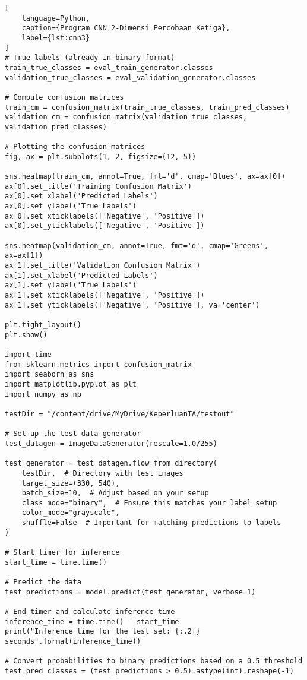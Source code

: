 \begin{lstlisting}[
    language=Python,
    caption={Program CNN 2-Dimensi Percobaan Ketiga},
    label={lst:cnn3}
]
# True labels (already in binary format)
train_true_classes = eval_train_generator.classes
validation_true_classes = eval_validation_generator.classes

# Compute confusion matrices
train_cm = confusion_matrix(train_true_classes, train_pred_classes)
validation_cm = confusion_matrix(validation_true_classes, validation_pred_classes)

# Plotting the confusion matrices
fig, ax = plt.subplots(1, 2, figsize=(12, 5))

sns.heatmap(train_cm, annot=True, fmt='d', cmap='Blues', ax=ax[0])
ax[0].set_title('Training Confusion Matrix')
ax[0].set_xlabel('Predicted Labels')
ax[0].set_ylabel('True Labels')
ax[0].set_xticklabels(['Negative', 'Positive'])
ax[0].set_yticklabels(['Negative', 'Positive'])

sns.heatmap(validation_cm, annot=True, fmt='d', cmap='Greens', ax=ax[1])
ax[1].set_title('Validation Confusion Matrix')
ax[1].set_xlabel('Predicted Labels')
ax[1].set_ylabel('True Labels')
ax[1].set_xticklabels(['Negative', 'Positive'])
ax[1].set_yticklabels(['Negative', 'Positive'], va='center')

plt.tight_layout()
plt.show()

import time
from sklearn.metrics import confusion_matrix
import seaborn as sns
import matplotlib.pyplot as plt
import numpy as np

testDir = "/content/drive/MyDrive/KeperluanTA/testout"

# Set up the test data generator
test_datagen = ImageDataGenerator(rescale=1.0/255)

test_generator = test_datagen.flow_from_directory(
    testDir,  # Directory with test images
    target_size=(330, 540),
    batch_size=10,  # Adjust based on your setup
    class_mode="binary",  # Ensure this matches your label setup
    color_mode="grayscale",
    shuffle=False  # Important for matching predictions to labels
)

# Start timer for inference
start_time = time.time()

# Predict the data
test_predictions = model.predict(test_generator, verbose=1)

# End timer and calculate inference time
inference_time = time.time() - start_time
print("Inference time for the test set: {:.2f} seconds".format(inference_time))

# Convert probabilities to binary predictions based on a 0.5 threshold
test_pred_classes = (test_predictions > 0.5).astype(int).reshape(-1)


\end{lstlisting}
